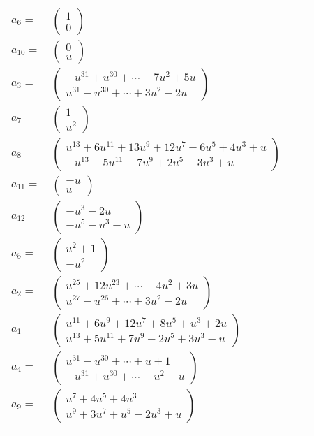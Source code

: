 \documentclass[1p]{elsarticle_modified}
\theoremstyle{definition}
\begin{document}
\begin{tabular}{m{7pt} m{180pt} m{7pt} m{180pt} }
\flushright $a_{6}=$&$\begin{pmatrix}1\\0\end{pmatrix}$ \\
\flushright $a_{10}=$&$\begin{pmatrix}0\\u\end{pmatrix}$ \\
\flushright $a_{3}=$&$\begin{pmatrix}- u^{31}+u^{30}+\cdots-7 u^2+5 u\\u^{31}- u^{30}+\cdots+3 u^2-2 u\end{pmatrix}$ \\
\flushright $a_{7}=$&$\begin{pmatrix}1\\u^2\end{pmatrix}$ \\
\flushright $a_{8}=$&$\begin{pmatrix}u^{13}+6 u^{11}+13 u^9+12 u^7+6 u^5+4 u^3+u\\- u^{13}-5 u^{11}-7 u^9+2 u^5-3 u^3+u\end{pmatrix}$ \\
\flushright $a_{11}=$&$\begin{pmatrix}- u\\u\end{pmatrix}$ \\
\flushright $a_{12}=$&$\begin{pmatrix}- u^3-2 u\\- u^5- u^3+u\end{pmatrix}$ \\
\flushright $a_{5}=$&$\begin{pmatrix}u^2+1\\- u^2\end{pmatrix}$ \\
\flushright $a_{2}=$&$\begin{pmatrix}u^{25}+12 u^{23}+\cdots-4 u^2+3 u\\u^{27}- u^{26}+\cdots+3 u^2-2 u\end{pmatrix}$ \\
\flushright $a_{1}=$&$\begin{pmatrix}u^{11}+6 u^9+12 u^7+8 u^5+u^3+2 u\\u^{13}+5 u^{11}+7 u^9-2 u^5+3 u^3- u\end{pmatrix}$ \\
\flushright $a_{4}=$&$\begin{pmatrix}u^{31}- u^{30}+\cdots+u+1\\- u^{31}+u^{30}+\cdots+u^2- u\end{pmatrix}$ \\
\flushright $a_{9}=$&$\begin{pmatrix}u^7+4 u^5+4 u^3\\u^9+3 u^7+u^5-2 u^3+u\end{pmatrix}$\\&\end{tabular}
\end{document}
